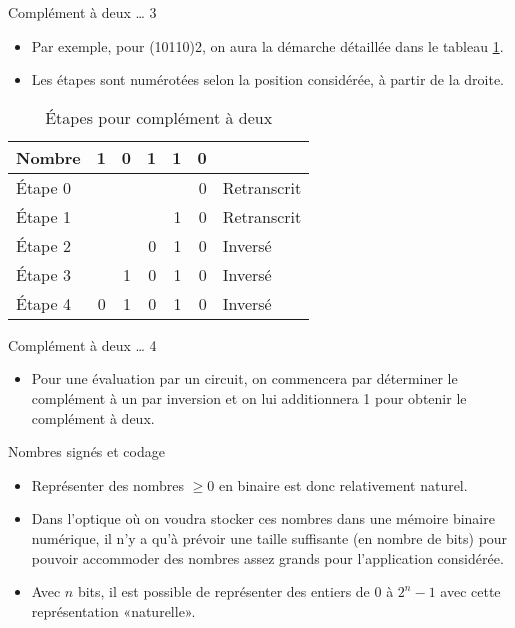 \documentclass[presentation]{beamer}
\begin{document}
\begin{frame}[label={sec:org4ad719a}]{Complément à deux \ldots{} 3}
\begin{itemize}
\item Par exemple, pour (10110)2, on aura la démarche détaillée dans le tableau \ref{tab:org71335b5}.

\item Les étapes sont numérotées selon la position considérée, à partir de la droite.
\end{itemize}

\begin{table}[htbp]
\caption{\label{tab:org71335b5}Étapes pour complément à deux}
\centering
\begin{tabular}{lrrrrrl}
Nombre & 1 & 0 & 1 & 1 & 0 & \\[0pt]
\hline
Étape 0 &  &  &  &  & 0 & Retranscrit\\[0pt]
Étape 1 &  &  &  & 1 & 0 & Retranscrit\\[0pt]
Étape 2 &  &  & 0 & 1 & 0 & Inversé\\[0pt]
Étape 3 &  & 1 & 0 & 1 & 0 & Inversé\\[0pt]
Étape 4 & 0 & 1 & 0 & 1 & 0 & Inversé\\[0pt]
\end{tabular}
\end{table}
\end{frame}

\begin{frame}[label={sec:org75daad6}]{Complément à deux \ldots{} 4}
\begin{itemize}
\item Pour une évaluation par un circuit, on commencera par déterminer le complément à un par inversion et on lui additionnera 1 pour obtenir le complément à deux.
\end{itemize}
\end{frame}

\begin{frame}[label={sec:org4819c9f}]{Nombres signés et codage}
\begin{itemize}
\item Représenter des nombres \(\geq 0\) en binaire est donc relativement naturel.

\item Dans l'optique où on voudra stocker ces nombres dans une mémoire binaire numérique, il n'y a qu'à prévoir une taille suffisante (en nombre de bits) pour pouvoir accommoder des nombres assez grands pour l'application considérée.

\item Avec \(n\) bits, il est possible de représenter des entiers de \(0\) à \(2^n-1\) avec cette représentation «naturelle».
\end{itemize}
\end{frame}
\end{document}
